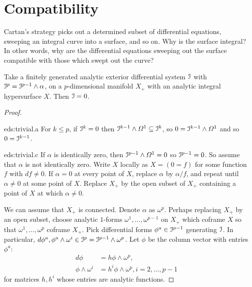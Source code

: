 \section{Compatibility}
Cartan's strategy picks out a determined subset of differential equations,
sweeping an integral curve into a surface, and so on.
Why is the surface integral?
In other words, why are the differential equations sweeping out the surface compatible with those which swept out the curve?
\begin{lemma}\label{lemma:domino}
Take a finitely generated analytic exterior differential system \(\mathcal{I}\) with \(\mathcal{I}^p=\mathcal{I}^{p-1}\wedge\alpha\), on a \(p\)-dimensional manifold \(X_+\) with an analytic integral hypersurface \(X\).
Then \(\mathcal{I}=0\).
\end{lemma}
\begin{proof}
\begin{answer}{eds:trivial.a}
For \(k\le p\), if \(\mathcal{I}^k=0\) then \(\mathcal{I}^{k-1}\wedge\Omega^1\subseteq \mathcal{I}^k\), so \(0=\mathcal{I}^{k-1}\wedge\Omega^1\) and so \(0=\mathcal{I}^{k-1}\).
\end{answer}
\begin{answer}{eds:trivial.c}
If \(\alpha\) is identically zero, then \(\mathcal{I}^{p-1}\wedge \Omega^1=0\) so \(\mathcal{I}^{p-1}=0\).
So assume that \(\alpha\) is not identically zero.
Write \(X\) locally as \(X=(0=f)\) for some function \(f\) with \(df\ne 0\).
If \(\alpha=0\) at every point of \(X\), replace \(\alpha\) by \(\alpha/f\), and repeat until \(\alpha\ne 0\) at some point of \(X\).
Replace \(X_+\) by the open subset of \(X_+\) containing a point of \(X\) at which \(\alpha\ne 0\).
\end{answer}
We can assume that \(X_+\) is connected.
Denote \(\alpha\) as \(\omega^p\).
Perhaps replacing \(X_+\) by an open subset, choose analytic \(1\)-forms \(\omega^1,\dots,\omega^{p-1}\) on \(X_+\) which coframe \(X\) so that \(\omega^1,\dots,\omega^p\) coframe \(X_+\).
Pick differential forms \(\phi^a\in\mathcal{I}^{p-1}\) generating \(\mathcal{I}\).
In particular, \(d\phi^a,\phi^a\wedge\omega^i\in\mathcal{I}^p=\mathcal{I}^{p-1}\wedge\omega^p\).
Let \(\phi\) be the column vector with entries \(\phi^a\):
\begin{align*}
d\phi &= h \phi\wedge\omega^p,\\
\phi\wedge\omega^i&=h^i \phi\wedge\omega^p, i=2,\dots,p-1
\end{align*}
for matrices \(h,h^i\) whose entries are analytic functions.


\end{proof}
